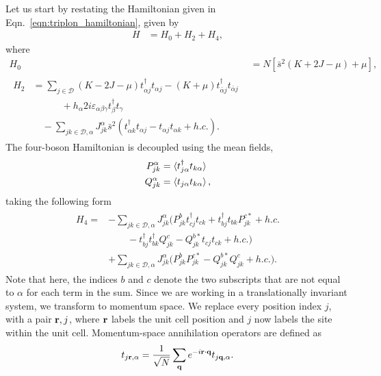 Let us start by restating the Hamiltonian given in Eqn.~\ref{eqn:triplon_hamiltonian}, given by 
\begin{align}
    H &=H_0 + H_2 + H_4,
\end{align}
where
\begin{align}
    H_0 &=  N\left [ \bar s^2 (K + 2 J - \mu)  + \mu\right ],\\
    \begin{split}
    H_2 &=  \sum_{j \in  \mathcal D} 
    (K - 2 J - \mu) t_{\alpha j}^\dag t_{\alpha j} 
    - (K+\mu) t_{\bar \alpha j }^\dag t_{\bar \alpha j }
    \\ 
    &\qquad \quad +h_\alpha 2i\varepsilon_{\alpha \beta \gamma} t^\dag_\beta t_\gamma \\
    &\quad - \sum_{jk \in \mathcal D, \alpha} 
    J^\alpha _{jk} \bar s^2 \left (
     t_{\alpha k}^\dag t_{\alpha j} 
    - t_{\alpha j} t_{\alpha k} + h.c.
    \right ).
    \end{split}
\end{align}
The four-boson Hamiltonian is decoupled using the mean fields, 
\begin{align} 
    P_{jk}^\alpha &= \braket{t_{j\alpha}^\dag t_{k\alpha}} 
    \\ 
    Q _{jk}^\alpha &= \braket{t_{j\alpha} t_{k\alpha}},
\end{align}
taking the following form
\begin{align}\begin{aligned}
    H_4 = 
    & - \sum_{jk \in \mathcal D, \alpha} J^\alpha _{jk} 
    \Big (
    P_{jk}^{b} t_{cj}^\dag t_{ck} +  t_{bj}^\dag t_{bk} P_{jk}^{c*} + h.c.  
    \\
    & \qquad 
    - t_{bj}^\dag t_{bk}^\dag Q^{c}_{jk} -  Q^{b * }_{jk} t_{cj} t_{ck}
    + h.c.   
    \Big )\\
    & + \sum_{jk \in \mathcal D, \alpha} J^\alpha _{jk} 
    \Big (
        P_{jk}^b P_{jk}^{c*} - Q^{b * }_{jk} Q^{c}_{jk} + h.c.
    \Big ).
\end{aligned} \end{align}
Note that here, the indices $b$ and $c$ denote the two subscripts that are not equal to $\alpha$ for each term in the sum. 
Since we are working in a translationally invariant system, we transform to momentum space. We replace every position index $j$, with a pair $\textbf r, j$, where $\textbf r$ labels the unit cell position and $j$ now labels the site within the unit cell. Momentum-space annihilation operators are defined as
\begin{align}
    t_{j \textbf r , \alpha} =\frac{1}{\sqrt N} \sum_{\textbf q} e^{-i \textbf r \cdot \textbf q }t_{j \textbf q , \alpha}.
\end{align}

